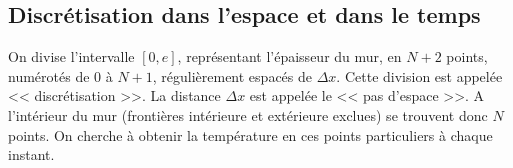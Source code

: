 \documentclass[10pt,fleqn]{article} %
\begin{document}
\begin{multicols}{2}
\begin{multicols}{2}
%
%
%
%

%
%
\subsection*{Discrétisation dans l'espace et dans le temps}

On divise l'intervalle $[0,e]$, représentant l'épaisseur du mur, en $N+2$ points, numérotés de 0 à $N+1$, régulièrement espacés de $\Delta x$. Cette division est appelée << discrétisation >>. La distance $\Delta x$ est appelée le << pas d’espace >>. A l'intérieur du mur (frontières intérieure et extérieure exclues) se trouvent donc $N$ points. On cherche à obtenir la température en ces points particuliers à chaque instant. 



\end{multicols}
\end{multicols}
\end{document}
